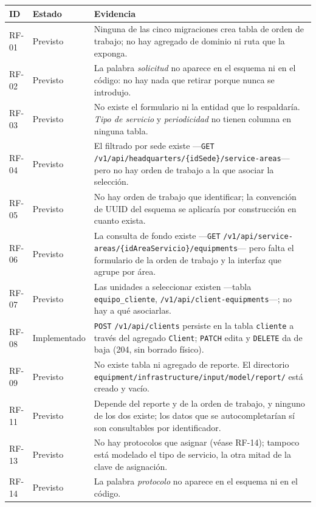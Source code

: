 \documentclass[12pt,varwidth=170mm,border=10pt]{standalone}
\newcommand{\ruta}[1]{\nolinkurl{#1}}
\begin{document}
\begingroup
\small
\begin{center}
\begin{tabular}{|p{1.3cm}|p{2.4cm}|p{10.3cm}|}
\hline
\textbf{ID} & \textbf{Estado} & \textbf{Evidencia} \\
\hline
RF-01 & Previsto & Ninguna de las cinco migraciones crea tabla de orden de trabajo; no hay agregado de dominio ni ruta que la exponga. \\
\hline
RF-02 & Previsto & La palabra \emph{solicitud} no aparece en el esquema ni en el código: no hay nada que retirar porque nunca se introdujo. \\
\hline
RF-03 & Previsto & No existe el formulario ni la entidad que lo respaldaría. \emph{Tipo de servicio} y \emph{periodicidad} no tienen columna en ninguna tabla. \\
\hline
RF-04 & Previsto & El filtrado por sede existe —\texttt{GET} \ruta{/v1/api/headquarters/{idSede}/service-areas}— pero no hay orden de trabajo a la que asociar la selección. \\
\hline
RF-05 & Previsto & No hay orden de trabajo que identificar; la convención de UUID del esquema se aplicaría por construcción en cuanto exista. \\
\hline
RF-06 & Previsto & La consulta de fondo existe —\texttt{GET} \ruta{/v1/api/service-areas/{idAreaServicio}/equipments}— pero falta el formulario de la orden de trabajo y la interfaz que agrupe por área. \\
\hline
RF-07 & Previsto & Las unidades a seleccionar existen —tabla \texttt{equipo\_cliente}, \ruta{/v1/api/client-equipments}—; no hay a qué asociarlas. \\
\hline
RF-08 & Implementado & \texttt{POST} \ruta{/v1/api/clients} persiste en la tabla \texttt{cliente} a través del agregado \texttt{Client}; \texttt{PATCH} edita y \texttt{DELETE} da de baja (204, sin borrado físico). \\
\hline
RF-09 & Previsto & No existe tabla ni agregado de reporte. El directorio \ruta{equipment/infrastructure/input/model/report/} está creado y vacío. \\
\hline
RF-11 & Previsto & Depende del reporte y de la orden de trabajo, y ninguno de los dos existe; los datos que se autocompletarían sí son consultables por identificador. \\
\hline
RF-13 & Previsto & No hay protocolos que asignar (véase RF-14); tampoco está modelado el tipo de servicio, la otra mitad de la clave de asignación. \\
\hline
RF-14 & Previsto & La palabra \emph{protocolo} no aparece en el esquema ni en el código. \\

\end{tabular}
\end{center}
\end{document}
